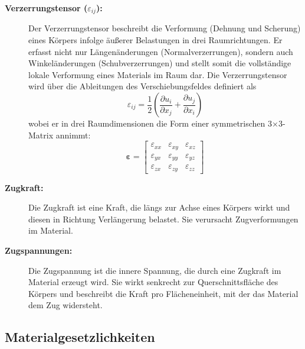 \begin{description}
	\item[\textbf{Verzerrungstensor ($\varepsilon_{ij}$):}] Der Verzerrungstensor beschreibt die Verformung (Dehnung und Scherung) eines Körpers infolge äußerer Belastungen in drei Raumrichtungen. 
	Er erfasst nicht nur Längenänderungen (Normalverzerrungen), sondern auch Winkeländerungen (Schubverzerrungen) und stellt somit die vollständige lokale Verformung eines Materials im Raum dar.
	Die Verzerrungstensor wird über die Ableitungen des Verschiebungsfeldes definiert als
	\begin{equation}
		\varepsilon_{ij} = 
		\frac{1}{2} \left( \frac{\partial u_i}{\partial x_j} + \frac{\partial u_j}{\partial x_i} \right)
	\end{equation}
	wobei er in drei Raumdimensionen die Form einer symmetrischen 3×3-Matrix annimmt:
	\begin{equation}
	\boldsymbol{\varepsilon} =
	\begin{bmatrix}
		\varepsilon_{xx} & \varepsilon_{xy} & \varepsilon_{xz} \\
		\varepsilon_{yx} & \varepsilon_{yy} & \varepsilon_{yz} \\
		\varepsilon_{zx} & \varepsilon_{zy} & \varepsilon_{zz}
	\end{bmatrix}
	\end{equation}
		
	\item[\textbf{Zugkraft:}] Die Zugkraft ist eine Kraft, die längs zur Achse eines Körpers wirkt und diesen in Richtung Verlängerung belastet. 
	Sie verursacht Zugverformungen im Material.
	
	\item[\textbf{Zugspannungen:}] Die Zugspannung ist die innere Spannung, die durch eine Zugkraft im Material erzeugt wird. 
	Sie wirkt senkrecht zur Querschnittsfläche des Körpers und beschreibt die Kraft pro Flächeneinheit, mit der das Material dem Zug widersteht.
\end{description}

\subsection{Materialgesetzlichkeiten}

